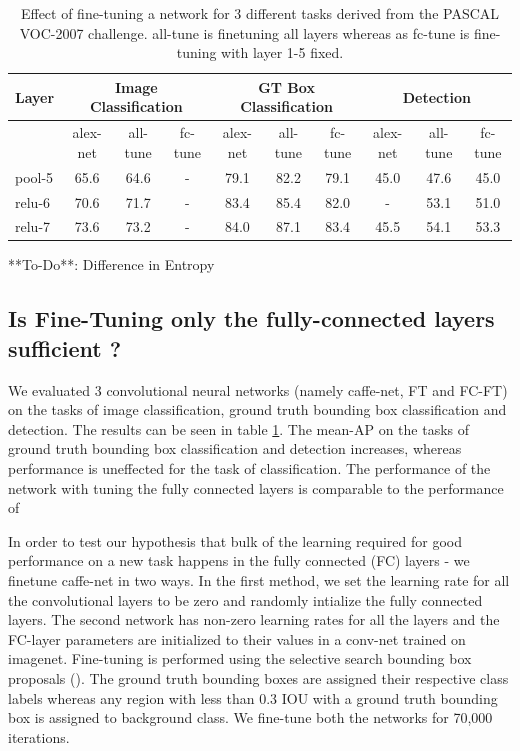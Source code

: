 \documentclass[runningheads]{llncs}
\begin{document}
\setlength{\tabcolsep}{2pt}
\begin{table}
\begin{center}
\caption{Effect of fine-tuning a network for 3 different tasks derived from the PASCAL VOC-2007 challenge. all-tune is finetuning all layers whereas as fc-tune is fine-tuning with layer 1-5 fixed.}
\label{table:fine-effect}
\begin{tabular}{l|ccc|ccc|ccc}
\hline\noalign{\smallskip}
Layer & \multicolumn{3}{c}{Image Classification}  & \multicolumn{3}{c}{GT Box Classification} & \multicolumn{3}{c}{Detection} \\
\hline
      & alex-net & all-tune & fc-tune & alex-net & all-tune & fc-tune & alex-net & all-tune & fc-tune \\
\hline
pool-5   & 65.6 & 64.6 & - & 79.1 & 82.2 & 79.1  & 45.0 & 47.6 & 45.0 \\
relu-6   & 70.6 & 71.7 & - & 83.4 & 85.4 & 82.0  &  -   & 53.1 & 51.0   \\
relu-7   & 73.6 & 73.2 & - & 84.0 & 87.1 & 83.4  & 45.5 & 54.1 & 53.3  \\
\hline
\end{tabular}
\end{center}
\end{table}
\setlength{\tabcolsep}{1.4pt}





**To-Do**: Difference in Entropy


\subsection{Is Fine-Tuning only the fully-connected layers sufficient ?}
We evaluated 3 convolutional neural networks (namely caffe-net, FT and FC-FT) on the tasks of image classification, ground truth bounding box classification and detection. The results can be seen in table \ref{table:fine-effect}. The mean-AP on the tasks of ground truth bounding box classification and detection increases, whereas performance is uneffected for the task of classification. The performance of the network with tuning the fully connected layers is comparable to the performance of


In order to test our hypothesis that bulk of the learning required for good performance on a new task happens in the fully connected (FC) layers - we finetune caffe-net in two ways. In the first method, we set the learning rate for all the convolutional layers to be zero and randomly intialize the fully connected layers. The second network has non-zero learning rates for all the layers and the FC-layer parameters are initialized to their values in a conv-net trained on imagenet. Fine-tuning is performed  using the selective search bounding box proposals (\cite{rcnn}). The ground truth bounding boxes are assigned their respective class labels whereas any region with less than 0.3 IOU with a ground truth bounding box is assigned to background class. We fine-tune both the networks for 70,000 iterations.
\end{document}
